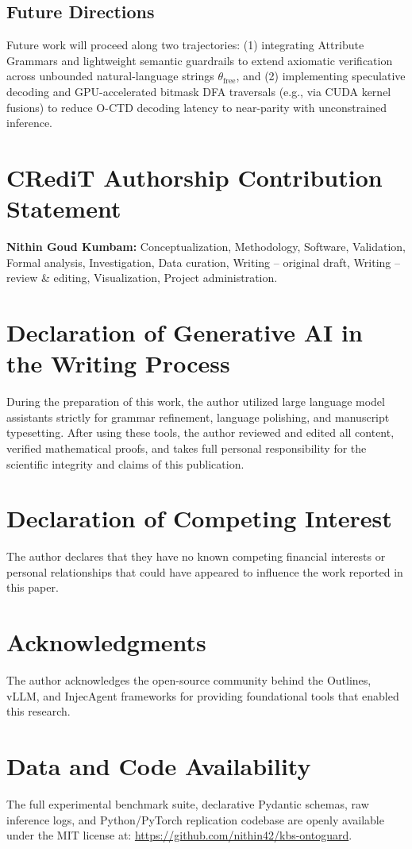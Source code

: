 \documentclass[preprint,12pt,3p]{elsarticle}
\begin{document}
\subsection{Future Directions}
Future work will proceed along two trajectories: (1) integrating Attribute Grammars and lightweight semantic guardrails to extend axiomatic verification across unbounded natural-language strings $\theta_{\text{free}}$, and (2) implementing speculative decoding and GPU-accelerated bitmask DFA traversals (e.g., via CUDA kernel fusions) to reduce O-CTD decoding latency to near-parity with unconstrained inference.

\section*{CRediT Authorship Contribution Statement}
\textbf{Nithin Goud Kumbam:} Conceptualization, Methodology, Software, Validation, Formal analysis, Investigation, Data curation, Writing -- original draft, Writing -- review \& editing, Visualization, Project administration.

\section*{Declaration of Generative AI in the Writing Process}
During the preparation of this work, the author utilized large language model assistants strictly for grammar refinement, language polishing, and manuscript typesetting. After using these tools, the author reviewed and edited all content, verified mathematical proofs, and takes full personal responsibility for the scientific integrity and claims of this publication.

\section*{Declaration of Competing Interest}
The author declares that they have no known competing financial interests or personal relationships that could have appeared to influence the work reported in this paper.

\section*{Acknowledgments}
The author acknowledges the open-source community behind the Outlines, vLLM, and InjecAgent frameworks for providing foundational tools that enabled this research.

\section*{Data and Code Availability}
The full experimental benchmark suite, declarative Pydantic schemas, raw inference logs, and Python/PyTorch replication codebase are openly available under the MIT license at: \url{https://github.com/nithin42/kbs-ontoguard}.
\end{document}
